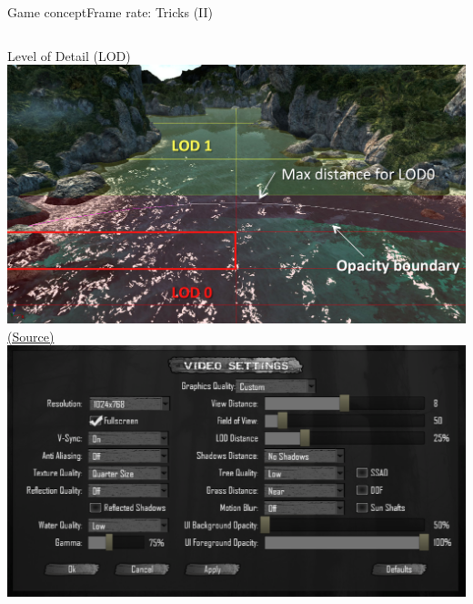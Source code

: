 \documentclass[10pt,compress]{beamer} %
\begin{document}
\begin{frame}{Game concept}{Frame rate: Tricks (II)}
\begin{columns}
	   	\smallskip
		\begin{center}
	    	Level of Detail (LOD)\\
		    \includegraphics[width=\linewidth]{figs/lod2}\\
			\tiny{\href{http://www.fxguide.com/featured/assassins-creed-iii-the-tech-behind-or-beneath-the-action/}{(Source)}}
		    \includegraphics[width=\linewidth]{figs/lod}\\
		\end{center}
    \end{columns}

\end{frame}
\end{document}
